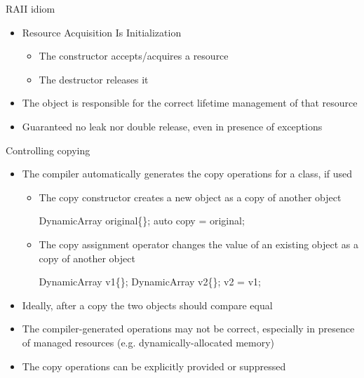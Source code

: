 \begin{frame}{RAII idiom}

  \begin{itemize}[<+->]
  \item Resource Acquisition Is Initialization
    \begin{itemize}
    \item The constructor accepts/acquires a resource
    \item The destructor releases it
    \end{itemize}
  \item The object is responsible for the correct lifetime management of that
    resource
  \item Guaranteed no leak nor double release, even in presence of exceptions
  \end{itemize}

\end{frame}

\begin{frame}[fragile]{Controlling copying}
  \begin{itemize}
  \item<1-> The compiler automatically generates the copy operations for a class, if used
    \begin{itemize}
    \item The copy constructor creates a \alert{new} object as a copy of
      another object

      \begin{codeblock}
DynamicArray original\{\ddd\};
auto copy = original;\end{codeblock}

    \item The copy assignment operator changes the value of an \alert{existing}
      object as a copy of another object

      \begin{codeblock}
DynamicArray v1\{\ddd\};
DynamicArray v2\{\ddd\};
v2 = v1;\end{codeblock}

    \end{itemize}

  \item<2-> Ideally, after a copy the two objects should compare equal
  \item<3-> The compiler-generated operations may not be correct,
    especially in presence of managed resources
    (e.g. dynamically-allocated memory)
  \item<3-> The copy operations can be explicitly provided or suppressed
  \end{itemize}
\end{frame}

